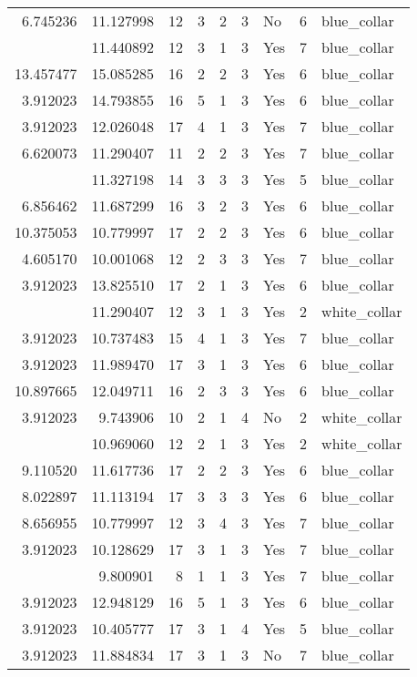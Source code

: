 \documentclass[
]{article}
\begin{document}
\begin{longtable}[t]{rrrrrllrl}
6.745236 & 11.127998 & 12 & 3 & 2 & 3 & No & 6 & blue\_collar\\
\addlinespace
3.912023 & 11.440892 & 12 & 3 & 1 & 3 & Yes & 7 & blue\_collar\\
13.457477 & 15.085285 & 16 & 2 & 2 & 3 & Yes & 6 & blue\_collar\\
3.912023 & 14.793855 & 16 & 5 & 1 & 3 & Yes & 6 & blue\_collar\\
3.912023 & 12.026048 & 17 & 4 & 1 & 3 & Yes & 7 & blue\_collar\\
6.620073 & 11.290407 & 11 & 2 & 2 & 3 & Yes & 7 & blue\_collar\\
\addlinespace
8.116716 & 11.327198 & 14 & 3 & 3 & 3 & Yes & 5 & blue\_collar\\
6.856462 & 11.687299 & 16 & 3 & 2 & 3 & Yes & 6 & blue\_collar\\
10.375053 & 10.779997 & 17 & 2 & 2 & 3 & Yes & 6 & blue\_collar\\
4.605170 & 10.001068 & 12 & 2 & 3 & 3 & Yes & 7 & blue\_collar\\
3.912023 & 13.825510 & 17 & 2 & 1 & 3 & Yes & 6 & blue\_collar\\
\addlinespace
3.912023 & 11.290407 & 12 & 3 & 1 & 3 & Yes & 2 & white\_collar\\
3.912023 & 10.737483 & 15 & 4 & 1 & 3 & Yes & 7 & blue\_collar\\
3.912023 & 11.989470 & 17 & 3 & 1 & 3 & Yes & 6 & blue\_collar\\
10.897665 & 12.049711 & 16 & 2 & 3 & 3 & Yes & 6 & blue\_collar\\
3.912023 & 9.743906 & 10 & 2 & 1 & 4 & No & 2 & white\_collar\\
\addlinespace
3.912023 & 10.969060 & 12 & 2 & 1 & 3 & Yes & 2 & white\_collar\\
9.110520 & 11.617736 & 17 & 2 & 2 & 3 & Yes & 6 & blue\_collar\\
8.022897 & 11.113194 & 17 & 3 & 3 & 3 & Yes & 6 & blue\_collar\\
8.656955 & 10.779997 & 12 & 3 & 4 & 3 & Yes & 7 & blue\_collar\\
3.912023 & 10.128629 & 17 & 3 & 1 & 3 & Yes & 7 & blue\_collar\\
\addlinespace
3.912023 & 9.800901 & 8 & 1 & 1 & 3 & Yes & 7 & blue\_collar\\
3.912023 & 12.948129 & 16 & 5 & 1 & 3 & Yes & 6 & blue\_collar\\
3.912023 & 10.405777 & 17 & 3 & 1 & 4 & Yes & 5 & blue\_collar\\
3.912023 & 11.884834 & 17 & 3 & 1 & 3 & No & 7 & blue\_collar\\

\end{longtable}
\end{document}
